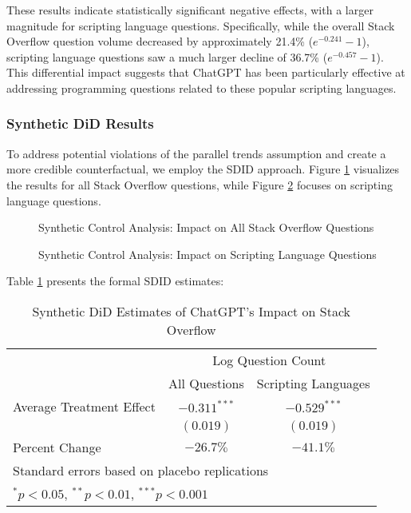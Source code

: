 These results indicate statistically significant negative effects, with a larger magnitude for scripting language questions. Specifically, while the overall Stack Overflow question volume decreased by approximately 21.4\% ($e^{-0.241}-1$), scripting language questions saw a much larger decline of 36.7\% ($e^{-0.457}-1$). This differential impact suggests that ChatGPT has been particularly effective at addressing programming questions related to these popular scripting languages.

\subsubsection{Synthetic DiD Results}
To address potential violations of the parallel trends assumption and create a more credible counterfactual, we employ the SDID approach. Figure \ref{fig:sdid_all} visualizes the results for all Stack Overflow questions, while Figure \ref{fig:sdid_script} focuses on scripting language questions.

\begin{figure}[htpb!]
    \centering
    
    \caption{Synthetic Control Analysis: Impact on All Stack Overflow Questions}
    \label{fig:sdid_all}
\end{figure}

\begin{figure}[htpb!]
    \centering
    
    \caption{Synthetic Control Analysis: Impact on Scripting Language Questions}
    \label{fig:sdid_script}
\end{figure}

Table \ref{tab:sdid_results} presents the formal SDID estimates:

\begin{table}[htpb!]
    \centering
    \caption{Synthetic DiD Estimates of ChatGPT's Impact on Stack Overflow}
    \label{tab:sdid_results}
    \begin{tabular}{lcc}
        \toprule
            & \multicolumn{2}{c}{Log Question Count} \\
            \cmidrule(lr){2-3}
            & All Questions & Scripting Languages \\
        \midrule
            Average Treatment Effect & $-0.311^{***}$ & $-0.529^{***}$ \\
            & $(0.019)$      & $(0.019)$ \\
            \midrule
            Percent Change & $-26.7\%$ & $-41.1\%$ \\
        \bottomrule
            \multicolumn{3}{l}{\footnotesize Standard errors based on placebo replications} \\
            \multicolumn{3}{l}{\footnotesize $^{*}p<0.05$, $^{**}p<0.01$, $^{***}p<0.001$} \\
    \end{tabular}
\end{table}

